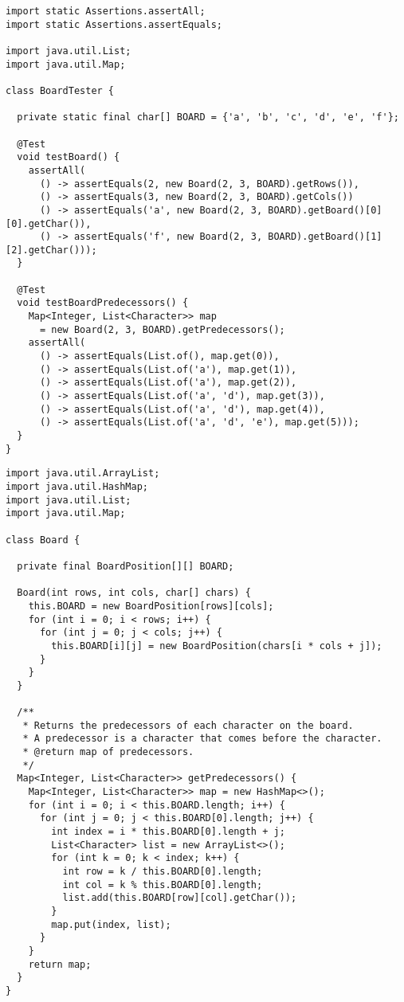 \begin{lstlisting}[language=MyJava]
import static Assertions.assertAll;
import static Assertions.assertEquals;

import java.util.List;
import java.util.Map;

class BoardTester {

  private static final char[] BOARD = {'a', 'b', 'c', 'd', 'e', 'f'};

  @Test
  void testBoard() {
    assertAll(
      () -> assertEquals(2, new Board(2, 3, BOARD).getRows()),
      () -> assertEquals(3, new Board(2, 3, BOARD).getCols())
      () -> assertEquals('a', new Board(2, 3, BOARD).getBoard()[0][0].getChar()),
      () -> assertEquals('f', new Board(2, 3, BOARD).getBoard()[1][2].getChar()));
  }

  @Test
  void testBoardPredecessors() {
    Map<Integer, List<Character>> map 
      = new Board(2, 3, BOARD).getPredecessors();
    assertAll(
      () -> assertEquals(List.of(), map.get(0)),
      () -> assertEquals(List.of('a'), map.get(1)),
      () -> assertEquals(List.of('a'), map.get(2)),
      () -> assertEquals(List.of('a', 'd'), map.get(3)),
      () -> assertEquals(List.of('a', 'd'), map.get(4)),
      () -> assertEquals(List.of('a', 'd', 'e'), map.get(5)));
  }
}
\end{lstlisting}

\enlargethispage{-4\baselineskip}
\begin{lstlisting}[language=MyJava]
import java.util.ArrayList;
import java.util.HashMap;
import java.util.List;
import java.util.Map;

class Board {

  private final BoardPosition[][] BOARD;

  Board(int rows, int cols, char[] chars) {
    this.BOARD = new BoardPosition[rows][cols];
    for (int i = 0; i < rows; i++) {
      for (int j = 0; j < cols; j++) {
        this.BOARD[i][j] = new BoardPosition(chars[i * cols + j]);
      }
    }
  }

  /**
   * Returns the predecessors of each character on the board.
   * A predecessor is a character that comes before the character.
   * @return map of predecessors.
   */
  Map<Integer, List<Character>> getPredecessors() {
    Map<Integer, List<Character>> map = new HashMap<>();
    for (int i = 0; i < this.BOARD.length; i++) {
      for (int j = 0; j < this.BOARD[0].length; j++) {
        int index = i * this.BOARD[0].length + j;
        List<Character> list = new ArrayList<>();
        for (int k = 0; k < index; k++) {
          int row = k / this.BOARD[0].length;
          int col = k % this.BOARD[0].length;
          list.add(this.BOARD[row][col].getChar());
        }
        map.put(index, list);
      }
    }
    return map;
  }
}
\end{lstlisting}

